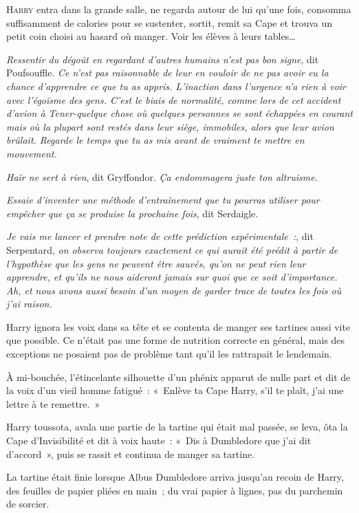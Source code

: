 
\lettrine{H}{arry} entra dans la grande salle, ne regarda autour de lui qu'une fois, consomma suffisamment de calories pour se sustenter, sortit, remit sa Cape et trouva un petit coin choisi au hasard où manger.
Voir les élèves à leurs tables…

\emph{Ressentir du dégoût en regardant d'autres humains n'est pas bon signe}, dit Poufsouffle.
\emph{Ce n'est pas raisonnable de leur en vouloir de ne pas avoir eu la chance d'apprendre ce que tu as appris.
L'inaction dans l'urgence n'a rien à voir avec l'égoïsme des gens.
C'est le biais de normalité, comme lors de cet accident d'avion à Tener-quelque chose où quelques personnes se sont échappées en courant mais où la plupart sont restés dans leur siège, immobiles, alors que leur avion brûlait.
Regarde le temps que tu as mis avant de vraiment te mettre en mouvement.}

\emph{Haïr ne sert à rien}, dit Gryffondor.
\emph{Ça endommagera juste ton altruisme.}

\emph{Essaie d'inventer une méthode d'entraînement que tu pourras utiliser pour empêcher que ça se produise la prochaine fois}, dit Serdaigle.

\emph{Je vais me lancer et prendre note de cette prédiction expérimentale~:}, dit Serpentard, \emph{on observa toujours exactement ce qui aurait été prédit à partir de l'hypothèse que les gens ne peuvent être sauvés, qu'on ne peut rien leur apprendre, et qu'ils ne nous aideront jamais sur quoi que ce soit d'importance.
Ah, et nous avons aussi besoin d'un moyen de garder trace de toutes les fois où j'ai raison.}

Harry ignora les voix dans sa tête et se contenta de manger ses tartines aussi vite que possible.
Ce n'était pas une forme de nutrition correcte en général, mais des exceptions ne posaient pas de problème tant qu'il les rattrapait le lendemain.

À mi-bouchée, l'étincelante silhouette d'un phénix apparut de nulle part et dit de la voix d'un vieil homme fatigué~: «~Enlève ta Cape Harry, s'il te plaît, j'ai une lettre à te remettre.~»

Harry toussota, avala une partie de la tartine qui était mal passée, se leva, ôta la Cape d'Invisibilité et dit à voix haute~: «~Dis à Dumbledore que j'ai dit d'accord~», puis se rassit et continua de manger sa tartine.

La tartine était finie lorsque Albus Dumbledore arriva jusqu'au recoin de Harry, des feuilles de papier pliées en main~; du vrai papier à lignes, pas du parchemin de sorcier.


